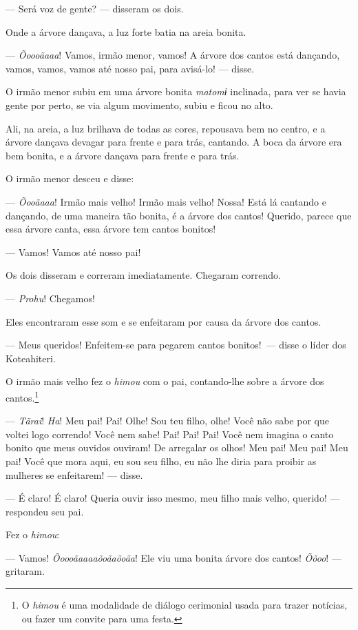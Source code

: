--- Será voz de gente? --- disseram os dois. 

Onde a árvore dançava, a luz forte batia na areia bonita. 

--- \textit{Õoooãaaa}! Vamos, irmão menor, vamos! A árvore dos cantos está
 dançando, vamos, vamos, vamos até nosso pai, para avisá-lo! --- disse. 

O irmão menor subiu em uma árvore bonita \textit{matomɨ} inclinada, para
 ver se havia gente por perto, se via algum movimento, subiu e ficou
 no alto. 

Ali, na areia, a luz brilhava de todas as cores, repousava bem no
 centro, e a árvore dançava devagar para frente e para trás, cantando. A boca da árvore era bem bonita, e a árvore dançava para frente e para trás. 

O irmão menor desceu e disse:

--- \textit{Õooãaaa}! Irmão mais velho! Irmão mais velho! Nossa! Está lá cantando
 e dançando, de uma maneira tão bonita, é a árvore dos cantos! Querido,
 parece que essa árvore canta, essa árvore tem cantos bonitos! 

--- Vamos! Vamos até nosso pai! 

Os dois disseram e correram imediatamente. Chegaram correndo.

--- \textit{Prohu}! Chegamos! 

Eles encontraram esse som e se enfeitaram por causa da árvore dos cantos. 

--- Meus queridos! Enfeitem-se para pegarem cantos bonitos!~--- disse o
 líder dos Koteahiteri. 

O irmão mais velho fez o \textit{himou} com o pai, contando-lhe sobre a
árvore dos cantos.\footnote{O \textit{himou} é uma modalidade de diálogo cerimonial usada para trazer notícias, ou fazer um convite para uma festa.}

--- \textit{Tãrai}! \textit{Ha}! Meu pai! Pai! Olhe! Sou teu filho, olhe! Você não sabe
 por que voltei logo correndo! Você nem sabe! Pai! Pai! Pai! Você nem
 imagina o canto bonito que meus ouvidos ouviram! De arregalar os olhos!
 Meu pai! Meu pai! Meu pai! Você que mora aqui, eu sou seu filho, eu não
 lhe diria para proibir as mulheres se enfeitarem! --- disse. 

--- É claro! É claro! Queria ouvir isso mesmo, meu filho mais velho,
 querido! --- respondeu seu pai. 

Fez o \textit{himou}: 

--- Vamos! \textit{Õoooãaaaaõoãaõoãa}! Ele viu uma bonita árvore dos cantos!
\textit{Õõoo}! --- gritaram. 

